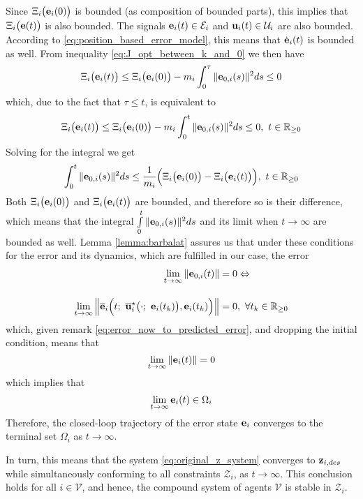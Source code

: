 Since $\Xi_i\big(\bm{\mathbf{e}}_i(0)\big)$
is bounded (as composition of bounded parts), this implies
that $\Xi_i\big(\bm{\mathbf{e}}(t)\big)$ is also bounded. The signals
$\bm{\mathbf{e}}_i(t) \in \mathcal{E}_i$ and $\bm{\mathbf{u}}_i(t) \in \mathcal{U}_i$
are also bounded. According to \eqref{eq:position_based_error_model}, this
means that $\dot{\bm{\mathbf{e}}}_i(t)$ is bounded as well. From inequality
\eqref{eq:J_opt_between_k_and_0} we then have
\begin{align}
  \Xi_i\big(\bm{\mathbf{e}}_i(t)\big) \leq \Xi_i\big(\bm{\mathbf{e}}_i(0)\big)
    -m_i \int_{0}^{\tau} \|\bm{\mathbf{e}}_{0,i}(s)\|^2 ds \leq 0
\end{align}
which, due to the fact that $\tau \leq t$, is equivalent to
\begin{align}
  \Xi_i\big(\bm{\mathbf{e}}_i(t)\big) \leq \Xi_i\big(\bm{\mathbf{e}}_i(0)\big) -m_i \int_{0}^{t} \|\bm{\mathbf{e}}_{0,i}(s)\|^2 ds \leq 0,\ t \in \mathbb{R}_{\geq 0}
\end{align}
Solving for the integral we get
\begin{align}
  \int_{0}^{t} \|\bm{\mathbf{e}}_{0,i}(s)\|^2 ds \leq
    \dfrac{1}{m_i}\Big(\Xi_i\big(\bm{\mathbf{e}}_i(0)\big) - \Xi_i\big(\bm{\mathbf{e}}_i(t)\big)\Big),\ t \in \mathbb{R}_{\geq 0}
\end{align}
Both $\Xi_i\big(\bm{\mathbf{e}}_i(0)\big)$ and $\Xi_i\big(\bm{\mathbf{e}}_i(t)\big)$
are bounded, and therefore so is their difference, which means that the
integral $\int\limits_{0}^{t} \|\bm{\mathbf{e}}_{0,i}(s)\|^2 ds$ and its limit when
$t \to \infty$ are bounded as well. Lemma \eqref{lemma:barbalat} assures us
that under these conditions for the error and its dynamics, which are
fulfilled in our case, the error
\begin{align}
  \lim\limits_{t \to \infty}\|\vect{e}_{0,i}(t)\| &= 0 \Leftrightarrow \\[2.5ex]
  \lim\limits_{t \to \infty}
  \Big\| \overline{\vect{e}}_i\Big(t;\ \overline{\vect{u}}_i^{\star}\big(\cdot;\ \vect{e}_i(t_k)\big), \vect{e}_i(t_k) \Big) \Big\| &= 0,\
\forall t_k \in \mathbb{R}_{\geq 0}
\end{align}
which, given remark \eqref{eq:error_now_to_predicted_error},
and dropping the initial condition, means that
$$\lim\limits_{t \to \infty}\|\bm{\mathbf{e}}_i(t)\| = 0$$
which implies that
$$\lim\limits_{t \to \infty}\bm{\mathbf{e}}_i(t) \in \Omega_i$$
Therefore, the closed-loop trajectory of the error state $\bm{\mathbf{e}}_i$ converges
to the terminal set $\Omega_i$ as $t \to \infty$.

In turn, this means that the system \eqref{eq:original_z_system} converges
to $\bm{\mathbf{z}}_{i,des}$ while simultaneously conforming to
all constraints $\mathcal{Z}_i$, as $t \to \infty$. This conclusion holds
for all $i \in \mathcal{V}$, and hence, the compound system of agents
$\mathcal{V}$ is stable in $\mathcal{Z}_i$.
\qedsymbol
